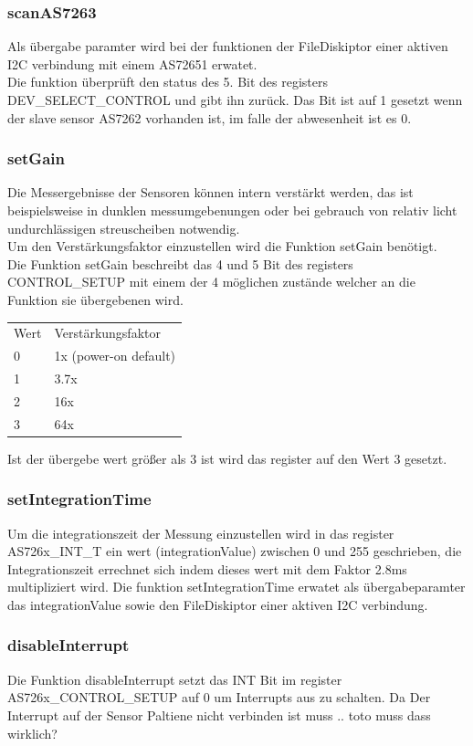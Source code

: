 \subsubsection{scanAS7263}
Als übergabe paramter wird bei der funktionen der FileDiskiptor einer aktiven I2C verbindung mit einem AS72651 erwatet.\\
Die funktion überprüft den status des 5. Bit des registers DEV\_SELECT\_CONTROL und gibt ihn zurück. Das Bit ist auf 1 gesetzt wenn der slave sensor AS7262 vorhanden ist, im falle der abwesenheit ist es 0.
\subsubsection{setGain}
Die Messergebnisse der Sensoren können intern verstärkt werden, das ist beispielsweise in dunklen messumgebenungen oder bei gebrauch von relativ licht undurchlässigen streuscheiben notwendig.\\
Um den Verstärkungsfaktor einzustellen wird die Funktion setGain benötigt.\\
Die Funktion setGain beschreibt das 4 und 5 Bit des registers CONTROL\_SETUP mit einem der 4 möglichen zustände welcher an die Funktion sie übergebenen wird.

\begin{tabular}{ l l}
 	Wert & Verstärkungsfaktor \\ 
 	0 & 1x (power-on default) \\  
 	1 & 3.7x \\
 	2 & 16x \\  
 	3 & 64x \\
\end{tabular}


Ist der übergebe wert größer als 3 ist wird das register auf den Wert 3 gesetzt.
\subsubsection{setIntegrationTime}
Um die integrationszeit der Messung einzustellen wird in das register AS726x\_INT\_T ein wert (integrationValue) zwischen 0 und 255 geschrieben, die Integrationszeit errechnet sich indem dieses wert mit dem Faktor 2.8ms multipliziert wird.
Die funktion setIntegrationTime erwatet als übergabeparamter das integrationValue sowie den FileDiskiptor einer aktiven I2C verbindung.\\

\subsubsection{disableInterrupt}
Die Funktion disableInterrupt setzt das INT Bit im register AS726x\_CONTROL\_SETUP auf 0 um Interrupts aus zu schalten.
Da Der Interrupt auf der Sensor Paltiene nicht verbinden ist muss .. toto muss dass wirklich?

